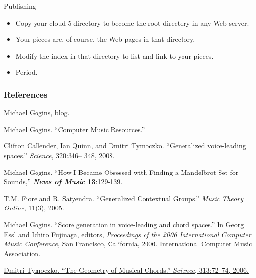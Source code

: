 \documentclass{beamer}
\begin{document}
\begin{frame}{Publishing}
\begin{itemize}
\item Copy your cloud-5 directory to become the root directory in any Web server.
\item Your pieces are, of course, the Web pages in that directory.
\item Modify the index in that directory to list and link to your pieces.
\item Period.
\end{itemize}
\end{frame}

\begin{frame}[allowframebreaks]
  \frametitle<presentation>{References}
    
  \begin{thebibliography}{10}
    
  \beamertemplatebookbibitems

   \href{http://michaelgogins.tumblr.com/}{Michael Gogins, blog}.
  
   \href{https://github.com/gogins/gogins.github.io}{Michael Gogins. ``Computer Music Resources.''}

   \href{http://www.sciencemag.org/content/320/5874/346.abstract}{Clifton Callender, Ian Quinn, and Dmitri Tymoczko. ``Generalized voice-leading spaces.'' \emph{Science}, 320:346–
348, 2008.}

   {Michael Gogins. ``How I Became Obsessed with Finding a Mandelbrot Set for Sounds,'' \textbf{\textit{News of Music}} \textbf{13}:129-139.}

   \href{http://www.mtosmt.org/issues/mto.05.11.3/mto.05.11.3.fiore_satyendra.pdf}{T.M. Fiore and R. Satyendra. ``Generalized Contextual
Groups.'' \emph{Music Theory Online}, 11(3), 2005}.

    \href{https://www.dropbox.com/s/ztej71n2fbn4tq4/Lindenmayer_Systems_Based_on_Riemannian_Transformations.pdf}{Michael Gogins. ``Score generation in voice-leading
and chord spaces.'' In Georg Essl and Ichiro Fujinaga,
editors, \emph{Proceedings of the 2006 International Computer Music Conference}, San Francisco, California,
2006. International Computer Music Association.}

   \href{http://www.sciencemag.org/content/313/5783/72.abstract?ijkey=wzKBea3ktKdu2&keytype=ref&siteid=sci}{Dmitri Tymoczko. ``The Geometry of Musical Chords.'' \emph{Science}, 313:72–74, 2006.}

  \end{thebibliography}

\end{frame}
\end{document}
